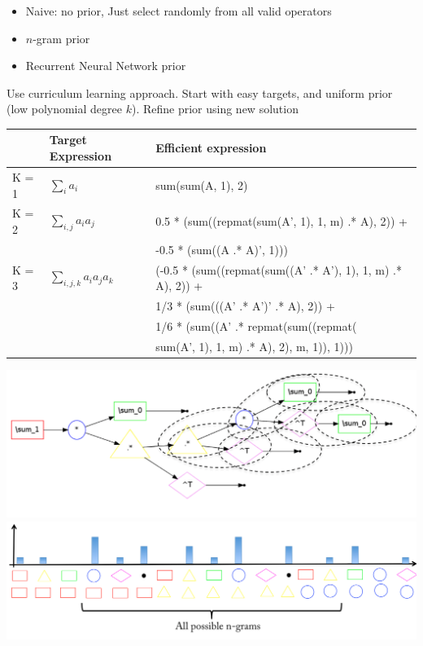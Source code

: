 \documentclass[landscape,a0b]{a0poster_csml_v2}
\begin{document}
\begin{poster}
\begin{PosterColumn}
\vspace{-1cm}
\begin{itemize}
  \item Naive: no prior, Just select randomly from all valid operators
  \item $n$-gram prior
  \item Recurrent Neural Network prior
\end{itemize}

Use curriculum learning approach.
Start with easy targets, and uniform prior (low polynomial degree $k$). 
Refine prior using new solution 

\begin{minipage}[hc]{\textwidth}
  \begin{center}
    \begin{tabular}{lll}
      \hline
        & Target Expression & Efficient expression \\
      \hline
      K = 1 \hspace{1cm} & $\sum_i a_i $ & sum(sum(A, 1), 2) \\
      \hline
      K = 2 & $\sum_{i,j} a_ia_j $ & 0.5 * (sum((repmat(sum(A', 1), 1, m) .* A), 2)) + \\
            & & -0.5 * (sum((A .* A)', 1))) \\
      \hline
      K = 3 & $\sum_{i, j, k}a_ia_ja_k$ & (-0.5 * (sum((repmat(sum((A' .* A'), 1), 1, m) .* A), 2)) + \\
      & & 1/3 * (sum(((A' .* A')' .* A), 2)) + \\
      & & 1/6 * (sum((A' .* repmat(sum((repmat( \\
      & & sum(A', 1), 1, m) .* A), 2), m, 1)), 1))) \\
      \hline
    \end{tabular}
  \end{center}
\end{minipage}

\end{PosterColumn}
\begin{PosterColumn} 

\begin{minipage}[hc]{\textwidth}
  \centering
  \includegraphics[width=0.47\linewidth]{imgs/bigram.png}
  \hfill
  \includegraphics[width=0.47\linewidth]{imgs/histogram.png}
\end{minipage}



\end{PosterColumn}
\end{poster}
\end{document}
